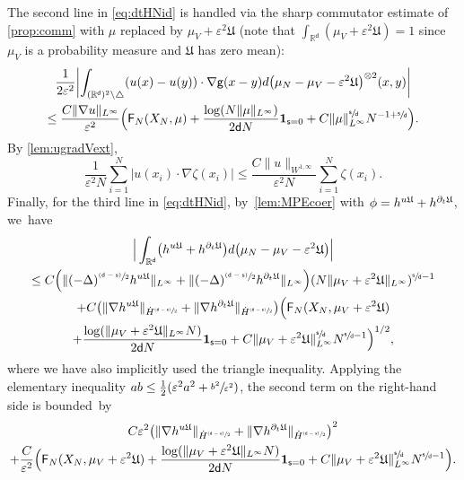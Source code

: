 \documentclass[JEP,XML,SOM,Unicode,published]{cedram}
\newcommand{\psfrac}[2]{\sfrac{(#1)}{#2}}
\theoremstyle{plain}
\theoremstyle{definition}
\DeclarePairedDelimiter{\pa}{\lparen}{\rparen}
\newcommand{\Bpa}[1]{\Bigl(#1\Bigr)}
\let\div\relax
\DeclareMathOperator{\div}{\mathrm{div}}
\newcommand{\R}{{\mathbb{R}}}
\let\vep\varepsilon
\let\p\partial
\let\ux X
\newcommand{\indic}{\mathbf{1}}
\newcommand{\Uu}{\mathfrak{U}}
\newcommand{\Fr}{\mathsf{F}}
\renewcommand{\d}{\mathsf{d}}
\newcommand{\g}{{\mathsf{g}}}
\newcommand{\s}{\mathsf{s}}
\begin{document}
The second line in \eqref{eq:dtHNid} is handled via the sharp commutator estimate of \cref{prop:comm} with $\mu$ replaced by $\mu_V+\vep^2\Uu$ (note that $\int_{\R^\d}(\mu_V+\vep^2\Uu) = 1$ since $\mu_V$ is a probability measure and $\Uu$ has zero mean):\vspace*{-5pt}
\begin{multline}\label{eq:LGronpot}
\frac{1}{2\vep^2}\biggl|\int_{(\R^\d)^2\setminus\triangle} \pa*{u(x)-u(y)}\cdot\nabla\g(x-y)d\pa*{\mu_N-\mu_V-\vep^2\Uu}^{\otimes 2}(x,y) \biggr| \\
\leq \frac{C\|\nabla u\|_{L^\infty}}{\vep^2}\Bpa{\Fr_N (\ux_N,\mu) + \frac{\log(N\|\mu\|_{L^\infty})}{2\d N}\indic_{\s=0} + C \|\mu\|_{L^\infty}^{\sfrac{\s}{\d}} N^{-1+\sfrac{\s}{\d}}}.
\end{multline}
By \cref{lem:ugradVext},\vspace*{-5pt}
\begin{equation}\label{eq:LGronzeta}
\frac{1}{\vep^2N}\sum_{i=1}^N|u(x_i)\cdot \nabla\zeta(x_i)| \leq \frac{C\|u\|_{W^{1,\infty}}}{\vep^2N}\sum_{i=1}^N \zeta(x_i).
\end{equation}
Finally, for the third line in \eqref{eq:dtHNid}, by~\cref{lem:MPEcoer} with $\phi = \div h^{u\Uu}+h^{\p_t\Uu}$, we~have\vspace*{-5pt}
\begin{multline}\label{eq:LGronRem}
\Big|\int_{\R^\d}\pa*{\div h^{u\Uu}+h^{\p_t\Uu}}d\pa*{\mu_N-\mu_V-\vep^2\Uu}\Big| \\
\leq C\pa*{\|(-\Delta)^{\psfrac{\d-\s}{2}}\div h^{u\Uu}\|_{L^\infty}+\|(-\Delta)^{\psfrac{\d-\s}{2}}h^{\p_t\Uu}\|_{L^\infty}}(N\|{\mu_V+\vep^2\Uu}\|_{L^\infty})^{\sfrac{\s}{\d}-1} \\
+ C\pa*{\|\nabla\div h^{u\Uu}\|_{\dot{H}^{\psfrac{\d-\s}{2}}} + \|\nabla h^{\p_t\Uu}\|_{\dot{H}^{\psfrac{\d-\s}{2}}}}\Big(\Fr_N(\ux_N,\mu_V+\vep^2\Uu)\\
+ \frac{\log(\|\mu_V+\vep^2\Uu\|_{L^\infty}N)}{2\d N}\indic_{\s=0} + C\|\mu_V+\vep^2\Uu\|_{L^\infty}^{\sfrac{\s}{\d}}N^{\sfrac{\s}{\d}-1}\Big)^{1/2},
\end{multline}
where we have also implicitly used the triangle inequality.
Applying the elementary inequality $ ab \le \frac12 (\vep^2 a^2+\sfrac{b^2}{ \vep^2})$, the second term on the right-hand side is bounded~by\vspace*{-8pt}
\begin{multline}\label{eq:prelog}
C\vep^2\pa*{\|\nabla\div h^{u\Uu}\|_{\dot{H}^{\psfrac{\d-\s}{2}}} + \|\nabla h^{\p_t\Uu}\|_{\dot{H}^{\psfrac{\d-\s}{2}}}}^2 \\
+ \frac{C}{\vep^2}\Big(\Fr_N(\ux_N,\mu_V+\vep^2\Uu) + \frac{\log(\|\mu_V+\vep^2\Uu\|_{L^\infty}N)}{2\d N}\indic_{\s=0}+ C\|\mu_V+\vep^2\Uu\|_{L^\infty}^{\sfrac{\s}{\d}}N^{\sfrac{\s}{\d}-1}\Big).
\end{multline}
\end{document}
